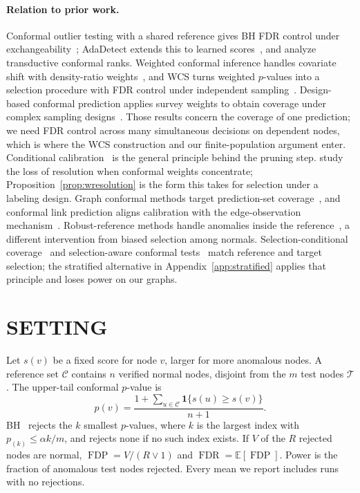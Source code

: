 \documentclass[twoside]{article}
\newcommand{\FDP}{\operatorname{FDP}}
\newcommand{\FDR}{\operatorname{FDR}}
\newcommand{\E}{\mathbb{E}}
\newcommand{\ind}{\mathbf{1}}
\newcommand{\calset}{\mathcal{C}}
\newcommand{\testset}{\mathcal{T}}
\begin{document}
\paragraph{Relation to prior work.}
Conformal outlier testing with a shared reference gives BH FDR control under exchangeability~\citep{bates2023testing,vovk2005algorithmic}; AdaDetect extends this to learned scores~\citep{marandon2024adaptive}, and \citet{gazin2024transductive} analyze transductive conformal ranks. Weighted conformal inference handles covariate shift with density-ratio weights~\citep{tibshirani2019conformal}, and WCS turns weighted $p$-values into a selection procedure with FDR control under independent sampling~\citep{jin2026weighted}. Design-based conformal prediction applies survey weights to obtain coverage under complex sampling designs~\citep{wieczorek2023design,lee2026survey}. Those results concern the coverage of one prediction; we need FDR control across many simultaneous decisions on dependent nodes, which is where the WCS construction and our finite-population argument enter. Conditional calibration~\citep{fithian2022conditional} is the general principle behind the pruning step. \citet{hennhofer2026resolution} study the loss of resolution when conformal weights concentrate; Proposition~\ref{prop:wresolution} is the form this takes for selection under a labeling design. Graph conformal methods target prediction-set coverage~\citep{huang2023uncertainty,zargarbashi2023conformal,zargarbashi2024inductive,davis2025dynamic}, and conformal link prediction aligns calibration with the edge-observation mechanism~\citep{marandon2023link}. Robust-reference methods handle anomalies inside the reference~\citep{bashari2025robust}, a different intervention from biased selection among normals. Selection-conditional coverage~\citep{jin2025focal} and selection-aware conformal tests~\citep{wang2024selective} match reference and target selection; the stratified alternative in Appendix~\ref{app:stratified} applies that principle and loses power on our graphs.

\section{SETTING}
Let $s(v)$ be a fixed score for node $v$, larger for more anomalous nodes. A reference set $\calset$ contains $n$ verified normal nodes, disjoint from the $m$ test nodes $\testset$. The upper-tail conformal $p$-value is
\begin{equation}
p(v)=\frac{1+\sum_{u\in\calset}\ind\{s(u)\ge s(v)\}}{n+1}.
\label{eq:p}
\end{equation}
BH~\citep{benjamini1995controlling} rejects the $k$ smallest $p$-values, where $k$ is the largest index with $p_{(k)}\le\alpha k/m$, and rejects none if no such index exists. If $V$ of the $R$ rejected nodes are normal, $\FDP=V/(R\vee1)$ and $\FDR=\E[\FDP]$. Power is the fraction of anomalous test nodes rejected. Every mean we report includes runs with no rejections.
\end{document}
